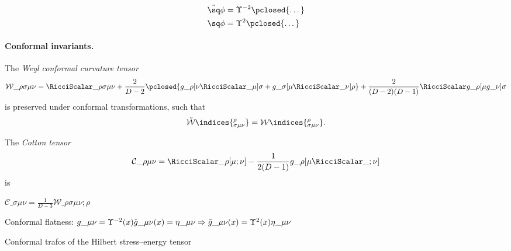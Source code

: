 \begin{draft}
{\begin{subequations}
    \begin{align}
        {}\tilde{\sq}\phi&=  \cfac^{-2} \pclosed{\dots} \\
        {}\sq\phi &= \cfac^2 \pclosed {\dots}
    \end{align}
\end{subequations}




\paragraph{Conformal invariants.} %
The \emph{Weyl conformal curvature tensor} 
\begin{equation}
    \mathcal{W}\_{\rho\sigma\mu\nu} =  \Ri\_{\rho\sigma\mu\nu} +\frac{2}{D-2} \pclosed{ %
        g\_{\rho[\nu} \Ri\_{\mu]\sigma} + g\_{\sigma[\mu} \Ri\_{\nu]\rho}  %
        } %
    + \frac{2}{(D-2)(D-1)} \Ri g\_{\rho[\mu} g\_{\nu]\sigma}
\end{equation}
is preserved under conformal transformations, such that 
\begin{equation}
    \tilde{\mathcal{W}}\indices{^\rho_{\sigma\mu\nu}} = \mathcal{W}\indices{^\rho_{\sigma\mu\nu}}.
\end{equation}


The \emph{Cotton tensor}
\begin{equation}
    \mathcal{C}\_{\rho\mu\nu} = \Ri\_{\rho[\mu;\nu]} - \frac{1}{2(D-1)} g\_{\rho[\mu} \Ri\_{;\nu]}
\end{equation}
is 

$ \mathcal{C}\_{\sigma\mu\nu}  = \frac{1}{D-3}  \mathcal{W}\_{\rho\sigma\mu\nu;\rho} $



}

    
\end{draft}





\begin{bullets}
    \item Conformal flatness: $g\_{\mu\nu}= \Upsilon^{-2}(x) \tilde{g}\_{\mu\nu} (x)= \eta\_{\mu\nu} \Rightarrow \tilde{g}\_{\mu\nu}(x)=\Upsilon^2(x) \eta\_{\mu\nu} $
    \item Conformal trafos of the Hilbert stress--energy tensor
\end{bullets}



